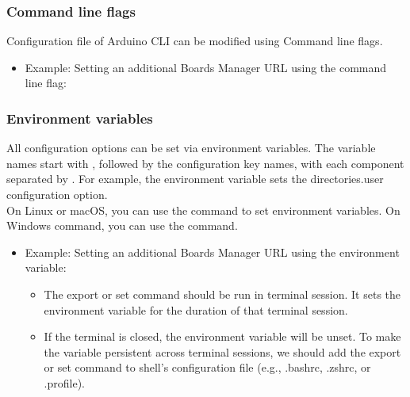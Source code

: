 \subsubsection{Command line flags}
Configuration file of Arduino CLI can be modified using Command line flags. \cite{ArduinoCLIConfig:2024}
\begin{itemize}
	\item Example:
	Setting an additional Boards Manager URL using the  command line flag:
	\newline
	\newline
\end{itemize}

\subsubsection{Environment variables}
All configuration options can be set via environment variables. The variable names start with , followed by the configuration key names, with each component separated by \SHELL{\_}. For example, the  environment variable sets the directories.user configuration option.
\\On Linux or macOS, you can use the  command to set environment variables. On Windows command, you can use the  command. \cite{ArduinoCLIConfig:2024}
\begin{itemize}
	\item Example:
	Setting an additional Boards Manager URL using the  environment variable:
	\newline
	\newline
	
	\begin{itemize}
		\item The export or set command should be run in terminal session. It sets the environment variable for the duration of that terminal session.
		\item If the terminal is closed, the environment variable will be unset. To make the variable persistent across terminal sessions, we should add the export or set command to shell's configuration file (e.g., .bashrc, .zshrc, or .profile).
	\end{itemize}
\end{itemize}


